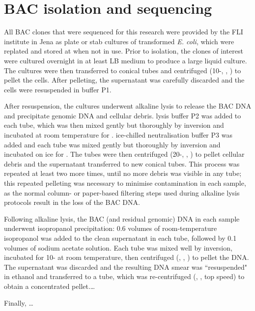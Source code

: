 \section{BAC isolation and sequencing}
\label{sec:methods_molec_bacs}

All BAC clones that were sequenced for this research were provided by the FLI institute in Jena as plate or stab cultures of transformed \textit{E. coli}, which were replated and stored at  when not in use. Prior to isolation, the clones of interest were cultured overnight in at least  LB medium to produce a large liquid culture. The cultures were then transferred to  conical tubes and centrifuged (10-, , ) to pellet the cells. After pelleting, the supernatant was carefully discarded and the cells were resuspended in  buffer P1.

After resuspension, the cultures underwent alkaline lysis to release the BAC DNA and precipitate genomic DNA and cellular debris.  lysis buffer P2 was added to each tube, which was then mixed gently but thoroughly by inversion and incubated at room temperature for .  ice-chilled neutralisation buffer P3 was added and each tube was mixed gently but thoroughly by inversion and incubated on ice for . The tubes were then centrifuged (20-, , ) to pellet cellular debris and the supernatant transferred to new conical tubes. This process was repeated at least two more times, until no more debris was visible in any tube; this repeated pelleting was necessary to minimise contamination in each sample, as the normal column- or paper-based filtering steps used during alkaline lysis protocols result in the loss of the BAC DNA.

Following alkaline lysis, the BAC (and residual genomic) DNA in each sample underwent isopropanol precipitation: 0.6 volumes of room-temperature isopropanol was added to the clean supernatant in each tube, followed by 0.1 volumes of  sodium acetate solution. Each tube was mixed well by inversion, incubated for 10- at room temperature, then centrifuged (, , ) to pellet the DNA. The supernatant was discarded and the resulting DNA smear was ``resuspended" in   ethanol and transferred to a  tube, which was re-centrifuged (, , top speed) to obtain a concentrated pellet.\dots %

Finally, \dots %

